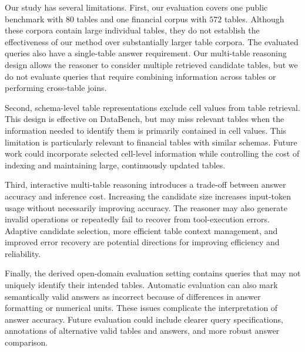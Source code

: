 Our study has several limitations.
First, our evaluation covers one public benchmark with $80$ tables and one financial corpus with $572$ tables.
Although these corpora contain large individual tables, they do not establish the effectiveness of our method over substantially larger table corpora.
The evaluated queries also have a single-table answer requirement.
Our multi-table reasoning design allows the reasoner to consider multiple retrieved candidate tables, but we do not evaluate queries that require combining information across tables or performing cross-table joins.

Second, schema-level table representations exclude cell values from table retrieval.
This design is effective on DataBench, but may miss relevant tables when the information needed to identify them is primarily contained in cell values.
This limitation is particularly relevant to financial tables with similar schemas.
Future work could incorporate selected cell-level information while controlling the cost of indexing and maintaining large, continuously updated tables.

Third, interactive multi-table reasoning introduces a trade-off between answer accuracy and inference cost.
Increasing the candidate size increases input-token usage without necessarily improving accuracy.
The reasoner may also generate invalid operations or repeatedly fail to recover from tool-execution errors.
Adaptive candidate selection, more efficient table context management, and improved error recovery are potential directions for improving efficiency and reliability.

Finally, the derived open-domain evaluation setting contains queries that may not uniquely identify their intended tables.
Automatic evaluation can also mark semantically valid answers as incorrect because of differences in answer formatting or numerical units.
These issues complicate the interpretation of answer accuracy.
Future evaluation could include clearer query specifications, annotations of alternative valid tables and answers, and more robust answer comparison.